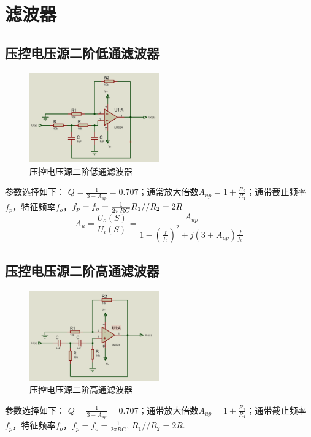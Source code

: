 \documentclass[a4paper,11pt,UTF8]{article}
\begin{document}


\section{滤波器}
\subsection{压控电压源二阶低通滤波器}
\begin{figure}[H]
	\centering
	\includegraphics[width=0.5\textwidth]{压控电压源二阶低通滤波器}
	\caption{压控电压源二阶低通滤波器}
\end{figure}
参数选择如下：
$Q = \frac{1}{3-A_{up}}=0.707$；通常放大倍数$A_{up}=1+\frac{R_2}{R_1}$；通带截止频率$f_p$，特征频率$f_o$，$f_p=f_o=\frac{1}{2\pi RC}\\ R_1//R_2=2R$
$$A_u=\frac{U_o(S)}{U_i(S)}=\frac{A_{up}}{1-(\frac{f}{f_{0}})^{2}+j(3+A_{up})\frac{f}{f_{0}}}$$
\subsection{压控电压源二阶高通滤波器}
\begin{figure}[H]
	\centering
	\includegraphics[width=0.5\textwidth]{压控电压源二阶高通滤波器}
	\caption{压控电压源二阶高通滤波器}
\end{figure}
参数选择如下：
$Q=\frac{1}{3-A_{up}}=0.707$；通带放大倍数$A_{up}=1+\frac{R_2}{R_1}$；通带截止频率$f_p$，特征频率$f_o$，$f_p=f_o=\frac{1}{2\pi RC}$, $R_1//R_2=2R$.
\end{document}
